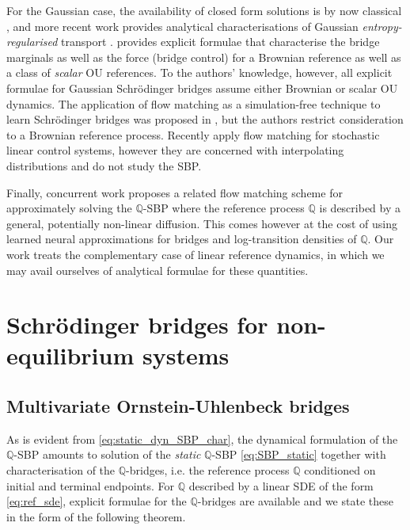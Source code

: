 \documentclass{article}
\theoremstyle{newstyle}
\begin{document}
For the Gaussian case, the availability of closed form solutions is by now classical \cite{olkin1982distance, takatsu2011wasserstein}, and more recent  work provides analytical characterisations of Gaussian \emph{entropy-regularised} transport \cite{bunne2023schrodinger, janati2020entropic, mallasto2022entropy}. \cite{bunne2023schrodinger} provides explicit formulae that characterise the bridge marginals as well as the force (bridge control) for a Brownian reference as well as a class of \emph{scalar} OU references. To the authors' knowledge, however, all explicit formulae for Gaussian Schr\"odinger bridges assume either Brownian or scalar OU dynamics.
The application of flow matching \cite{lipman2022flow, albergo2022building} as a simulation-free technique to learn Schr\"odinger bridges was proposed in \cite{tong2023simulation}, but the authors restrict consideration to a Brownian reference process. Recently \cite{mei2024flow} apply flow matching for stochastic linear control systems, however they are concerned with interpolating distributions and do not study the SBP.

Finally, concurrent work \cite{petrovic2025curly} proposes a related flow matching scheme for approximately solving the $\mathbb{Q}$-SBP where the reference process $\mathbb{Q}$ is described by a general, potentially non-linear diffusion. This comes however at the cost of using learned neural approximations for bridges and log-transition densities of $\mathbb{Q}$. Our work treats the complementary case of linear reference dynamics, in which we may avail ourselves of analytical formulae for these quantities. 

\section{Schr\"odinger bridges for non-equilibrium systems}
\subsection{Multivariate Ornstein-Uhlenbeck bridges}\label{sec:mvOU_bridges}

As is evident from \eqref{eq:static_dyn_SBP_char}, the dynamical formulation of the $\mathbb{Q}$-SBP amounts to solution of the \emph{static} $\mathbb{Q}$-SBP \eqref{eq:SBP_static} together with characterisation of the $\mathbb{Q}$-bridges, i.e. the reference process $\mathbb{Q}$ conditioned on initial and terminal endpoints. For $\mathbb{Q}$ described by a linear SDE of the form \eqref{eq:ref_sde}, explicit formulae for the $\mathbb{Q}$-bridges are available and we state these in the form of the following theorem. 
\end{document}
